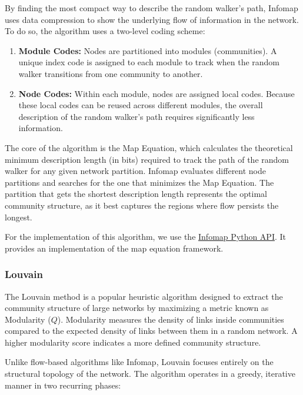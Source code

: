 \documentclass{article}
\begin{document}
By finding the most compact way to describe the random walker's path, Infomap uses data compression to show the underlying flow of information in the network. To do so, the algorithm uses a two-level coding scheme:

\begin{enumerate}
    \item \textbf{Module Codes:} Nodes are partitioned into modules (communities). A unique index code is assigned to each module to track when the random walker transitions from one community to another.
    \item \textbf{Node Codes:} Within each module, nodes are assigned local codes. Because these local codes can be reused across different modules, the overall description of the random walker's path requires significantly less information.
\end{enumerate}

The core of the algorithm is the Map Equation, which calculates the theoretical minimum description length (in bits) required to track the path of the random walker for any given network partition. Infomap evaluates different node partitions and searches for the one that minimizes the Map Equation. The partition that gets the shortest description length represents the optimal community structure, as it best captures the regions where flow persists the longest.

For the implementation of this algorithm, we use the \href{https://mapequation.github.io/infomap/python/}{Infomap Python API}. It provides an implementation of the map equation framework.


\subsubsection{Louvain}

The Louvain method \cite{blondel2008fast} is a popular heuristic algorithm designed to extract the community structure of large networks by maximizing a metric known as Modularity ($Q$). Modularity measures the density of links inside communities compared to the expected density of links between them in a random network. A higher modularity score indicates a more defined community structure.

Unlike flow-based algorithms like Infomap, Louvain focuses entirely on the structural topology of the network. The algorithm operates in a greedy, iterative manner in two recurring phases:
\end{document}
